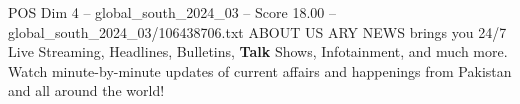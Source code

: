 \begin{textsample}{POS Dim 4 – global\_south\_2024\_03 – Score 18.00 – global\_south\_2024\_03/106438706.txt}
ABOUT US ARY NEWS brings you 24/7 Live Streaming, Headlines, Bulletins, \textbf{Talk} Shows, Infotainment, and much more.
Watch minute-by-minute updates of current affairs and happenings from Pakistan and all around the world!

\end{textsample}

